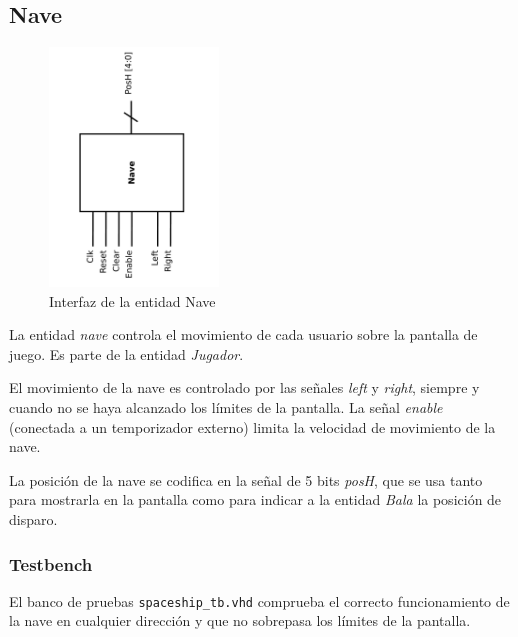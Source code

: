 \subsection{Nave}
\label{ship}

\begin{figure}[H]
	\centering
	\includegraphics[width=0.4\textwidth, angle=-90] {ship_block.pdf}
	\caption{Interfaz de la entidad Nave}\label{fig:ship_block}
\end{figure}


La entidad \textit{nave} controla el movimiento de cada usuario sobre la pantalla de juego. Es parte de la entidad \textit{Jugador}.

El movimiento de la nave es controlado por las señales \textit{left} y \textit{right}, siempre y cuando no se haya alcanzado los límites de la pantalla. La señal \textit{enable} (conectada a un temporizador externo) limita la velocidad de movimiento de la nave.

La posición de la nave se codifica en la señal de 5 bits \textit{posH}, que se usa tanto para mostrarla en la pantalla como para indicar a la entidad \textit{Bala} la posición de disparo.

\subsubsection{Testbench}
El banco de pruebas \texttt{spaceship\_tb.vhd} comprueba el correcto funcionamiento de la nave en cualquier dirección y que no sobrepasa los límites de la pantalla.
